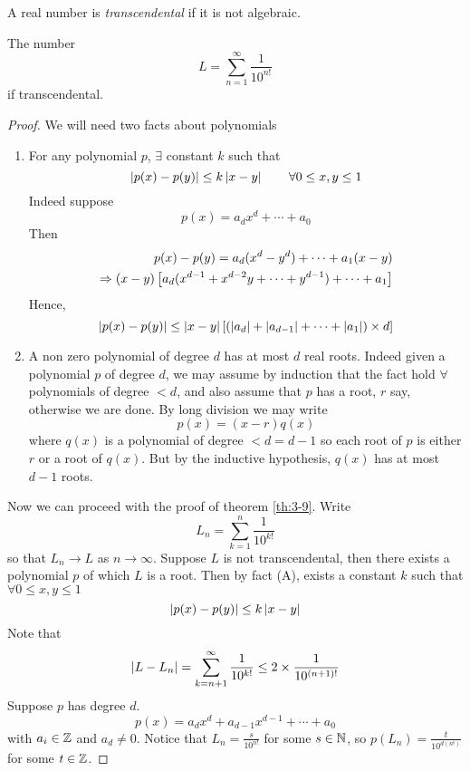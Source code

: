 \documentclass{article}
\begin{document}
\begin{defi}[Transcendental]
    A real number is \emph{transcendental} if it is not algebraic.
\end{defi}

\begin{nthm}[Louiville 1851]\label{th:3-9}
    The number
    \[
        L = \sum_{n=1}^\infty \frac{1}{10^{n!}}  
    \]
    if transcendental.
\end{nthm}
\begin{proof}
    We will need two facts about polynomials
    \begin{enumerate}[label=(\Alph*)]
        \item For any polynomial $p$, $\exists$ constant $k$ such that
        \[
            \left\lvert p(x) - p(y)\right\rvert \leq k \left\lvert x - y\right\rvert  \qquad \forall 0 \leq x, y \leq 1
        \]
        Indeed suppose
        \[
            p(x) = a_d x^d + \cdots + a_0  
        \]
        Then
        \begin{align*}
            p(x) - p(y) = a_d (x^d - y^d) + \cdots + a_1(x - y) \\
            \Rightarrow (x - y) \left[ a_d(x^{d-1} + x^{d-2}y + \cdots + y^{d-1}) + \cdots + a_1 \right]
        \end{align*}
        Hence,
        \[
            \left\lvert p(x) - p(y)\right\rvert \leq \left\lvert x - y\right\rvert \left[ 
                (\left\lvert a_d\right\rvert + \left\lvert a_{d - 1}\right\rvert + \cdots + \left\lvert a_1\right\rvert) \times d
             \right]
        \]

        \item A non zero polynomial of degree $d$ has at most $d$ real roots.
        Indeed given a polynomial $p$ of degree $d$, we may assume by induction that the fact hold $\forall$ polynomials of degree $< d$,
        and also assume that $p$ has a root, $r$ say, otherwise we are done. 
        By long division we may write
        \[
            p(x) = (x - r)q(x)  
        \]
        where $q(x)$ is a polynomial of degree $<d = d-1$ so each root of $p$ is either $r$ or a root of $q(x)$.
        But by the inductive hypothesis, $q(x)$ has at most $d-1$ roots.
    \end{enumerate}
    Now we can proceed with the proof of theorem \ref{th:3-9}.
    Write
    \[
        L_n = \sum_{k=1}^n \frac{1}{10^{k!}}  
    \]
    so that $L_n \rightarrow L$ as $n \rightarrow \infty$.
    Suppose $L$ is not transcendental, then there exists a polynomial $p$ of which $L$ is a root.
    Then by fact (A), exists a constant $k$ such that $\forall 0 \leq x, y \leq 1$
    \[
        \left\lvert p(x) - p(y)\right\rvert \leq k \left\lvert x - y\right\rvert
    \]
    Note that
    \[
        \left\lvert L - L_n\right\rvert = \sum_{k=n+1}^\infty \frac{1}{10^{k!}} \leq 2 \times \frac{1}{10^{(n+1)!}}
    \]
    Suppose $p$ has degree $d$.
    \[
        p(x) = a_d x^d + a_{d-1} x^{d-1} + \cdots + a_0  
    \]
    with $a_i \in \mathbb{Z}$ and $a_d \neq 0$. Notice that $L_n = \frac{s}{10^{n!}}$ for some $s \in \mathbb{N}$,
    so $p(L_n) = \frac{t}{10^{d(n!)}}$ for some $t \in \mathbb{Z}$.


\end{proof}
\end{document}
